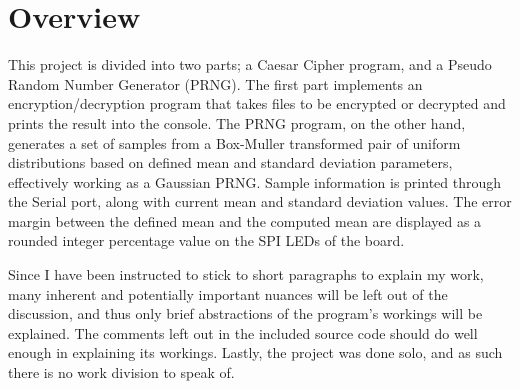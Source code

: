\documentclass{article}
\begin{document}


\section*{Overview}
\justify
\large

This project is divided into two parts; a Caesar Cipher program, and a Pseudo Random Number Generator (PRNG). The first part implements an encryption/decryption program that takes files to be encrypted or decrypted and prints the result into the console. The PRNG program, on the other hand, generates a set of samples from a Box-Muller transformed pair of uniform distributions based on defined mean and standard deviation parameters, effectively working as a Gaussian PRNG. Sample information is printed through the Serial port, along with current mean and standard deviation values. The error margin between the defined mean and the computed mean are displayed as a rounded integer percentage value on the SPI LEDs of the board.

Since I have been instructed to stick to short paragraphs to explain my work, many inherent and potentially important nuances will be left out of the discussion, and thus only brief abstractions of the program's workings will be explained. The comments left out in the included source code should do well enough in explaining its workings. Lastly, the project was done solo, and as such there is no work division to speak of.\pagebreak
\end{document}
